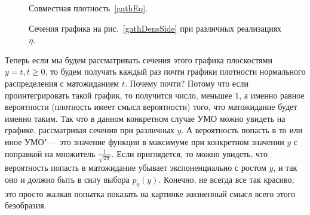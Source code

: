 \documentclass[../TV&MS.tex]{subfiles}
\begin{document}
\begin{figure}
\centering
\begin{minipage}[b]{0.5\textwidth}
    \centering
    \vfill
    \caption{Совместная плотность~\eqref{gathEq}.}
    \label{gathDensSide}
\end{minipage}%
\hfill
\begin{minipage}[b]{0.5\textwidth}
    \centering
    \vfill
    \caption{Сечения графика на рис.~\ref{gathDensSide} при различных реализациях $\eta$.}
    \label{cutsGathDens}
\end{minipage}
\end{figure}

Теперь если мы будем рассматривать сечения этого графика плоскостями
$y=t, t \geqslant 0$, то будем получать каждый раз почти графики плотности
нормального распределения с матожиданием $t$.
Почему почти? Потому что если проинтегрировать такой график, то получится
число, меньшее $1$, а именно равное вероятности (плотность имеет смысл
вероятности) того, что матожидание будет именно таким.
Так что в данном конкретном случае УМО можно увидеть на графике, рассматривая
сечения при различных $y$.
А вероятность попасть в то или иное УМО"---~это значение функции в максимуме
при конкретном значении $y$ с поправкой на множитель $\frac{1}{\sqrt{2\pi}}$. 
Если приглядется, то можно увидеть, что вероятность попасть в матожидание
убывает экспоненциально с ростом $y$, и так оно и должно быть в силу выбора
$p_\eta(y)$. 
Конечно, не всегда все так красиво, это просто жалкая попытка показать
на картинке жизненный смысл всего этого безобразия.

\newpage
\end{document}
